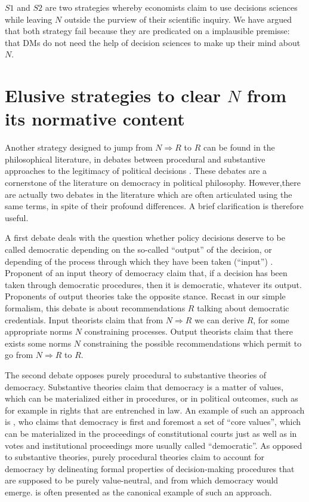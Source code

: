 \documentclass[preprint, french, english, 11pt, authoryear]{elsarticle}%
\begin{document}
$S1$ and $S2$ are two strategies whereby economists claim to use decisions sciences while leaving $N$ outside the purview of their scientific inquiry. We have argued that both strategy fail because they are predicated on a implausible premisse: that \acp{DM} do not need the help of decision sciences to make up their mind about $N$.

\section{\texorpdfstring{Elusive strategies to clear $N$ from its normative content}{Elusive strategies to clear N from its normative content}}
Another strategy designed to jump from $N ⇒ R$ to $R$ can be found in the philosophical literature, in debates between procedural and substantive approaches to the legitimacy of political decisions \cite{meinard_what_2017}. These debates are a cornerstone of the literature on democracy in political philosophy. However,there are actually two debates in the literature which are often articulated using the same terms, in spite of their profound differences. A brief clarification is therefore useful.

A first debate deals with the question whether policy decisions deserve to be called democratic depending on the so-called “output” of the decision, or depending of the process through which they have been taken (“input”) \cite{vatn_environmental_2016, backstrand_environmental_2010}. Proponent of an input theory of democracy claim that, if a decision has been taken through democratic procedures, then it is democratic, whatever its output. Proponents of output theories take the opposite stance. Recast in our simple formalism, this debate is about recommendations $R$ talking about democratic credentials. Input theorists claim that from $N ⇒ R$ we can derive $R$, for some appropriate norms $N$ constraining processes. Output theorists claim that there exists some norms $N$ constraining the possible recommendations which permit to go from $N ⇒ R$ to $R$.%

The second debate opposes purely procedural to substantive theories of democracy. Substantive theories claim that democracy is a matter of values, which can be materialized either in procedures, or in political outcomes, such as for example in rights that are entrenched in law. An example of such an approach is \cite{brettschneider_value_2006}, who claims that democracy is first and foremost a set of ``core values'', which can be materialized in the proceedings of constitutional courts just as well as in votes and institutional proceedings more usually called ``democratic''. As opposed to substantive theories, purely procedural theories claim to account for democracy by delineating formal properties of decision-making procedures that are supposed to be purely value-neutral, and from which democracy would emerge. \cite{habermas_faktizitat_1992} is often presented as the canonical example of such an approach. 
\end{document}
